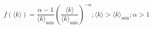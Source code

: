 
\begin{equation}
    f(\langle k \rangle)=\frac{\alpha-1}{\langle k \rangle_{\min }}\left(\frac{\langle k \rangle}{\langle k \rangle_{\min }}\right)^{-\alpha} ; \langle k \rangle>\langle k \rangle_{\min } ; \alpha>1
    \label{formula:合成图的平均度分布}
\end{equation}

